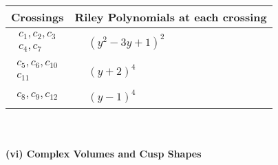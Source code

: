 \documentclass[1p]{elsarticle_modified}
\theoremstyle{definition}
\begin{document}
\begin{tabular}{m{50pt}|m{274pt}}
Crossings & \hspace{64pt}Riley Polynomials at each crossing \\
\hline $$\begin{aligned}c_{1},c_{2},c_{3}\\c_{4},c_{7}\end{aligned}$$&$\begin{aligned}
&(y^2-3 y+1)^2
\end{aligned}$\\
\hline $$\begin{aligned}c_{5},c_{6},c_{10}\\c_{11}\end{aligned}$$&$\begin{aligned}
&(y+2)^4
\end{aligned}$\\
\hline $$\begin{aligned}c_{8},c_{9},c_{12}\end{aligned}$$&$\begin{aligned}
&(y-1)^4
\end{aligned}$\\
\hline
\end{tabular}\\~\\
\newpage\flushleft \textbf{(vi) Complex Volumes and Cusp Shapes}
\end{document}
